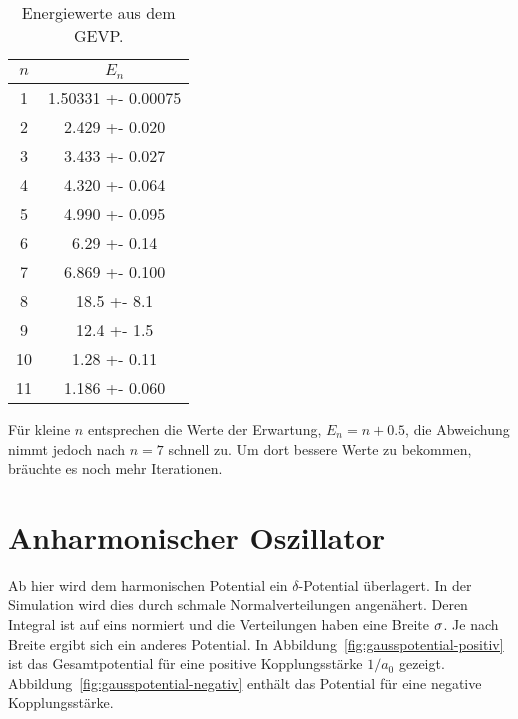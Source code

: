 \begin{table}
    \centering
    \begin{tabular}{SS}
        {$n$} & {$E_n$} \\
         & 1.50331 +- 0.00075 \\
         2 &   2.429 +- 0.020   \\
         3 &   3.433 +- 0.027   \\
         4 &   4.320 +- 0.064   \\
         5 &   4.990 +- 0.095   \\
         6 &    6.29 +- 0.14    \\
         7 &   6.869 +- 0.100   \\
         8 &    18.5 +- 8.1     \\
         9 &    12.4 +- 1.5     \\
        10 &    1.28 +- 0.11    \\
        11 &   1.186 +- 0.060  
    \end{tabular}
    \caption{%
        Energiewerte aus dem GEVP.
    }
    \label{tab:ED7AA2-eigenwerte}
\end{table}

Für kleine $n$ entsprechen die Werte der Erwartung, $E_n = n + \num{0.5}$, die
Abweichung nimmt jedoch nach $n = 7$ schnell zu. Um dort bessere Werte zu
bekommen, bräuchte es noch mehr Iterationen.

\FloatBarrier
\section{Anharmonischer Oszillator}

Ab hier wird dem harmonischen Potential ein $\delta$-Potential überlagert. In
der Simulation wird dies durch schmale Normalverteilungen angenähert. Deren
Integral ist auf eins normiert und die Verteilungen haben eine Breite
$\sigma$. Je nach Breite ergibt sich ein anderes Potential. In
Abbildung~\ref{fig:gausspotential-positiv} ist das Gesamtpotential für eine
positive Kopplungsstärke $1/a_0$ gezeigt.
Abbildung~\ref{fig:gausspotential-negativ} enthält das Potential für eine
negative Kopplungsstärke.

